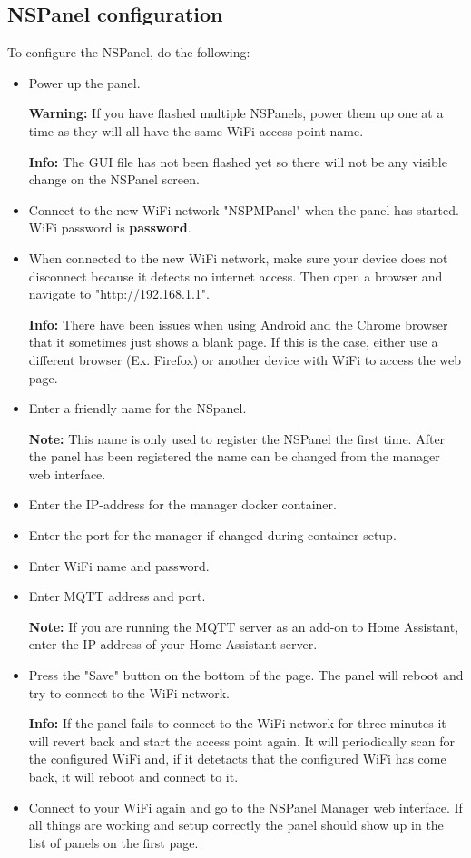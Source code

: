 \documentclass[10pt]{article}
\newcommand{\info}[1]{\begin{infoBox} \textbf{Info:} #1 \end{infoBox}}
\newcommand{\note}[1]{\begin{noteBox} \textbf{Note:} #1 \end{noteBox}}
\newcommand{\warning}[1]{\begin{hintBox} \textbf{Warning:} #1 \end{hintBox}}
\begin{document}
    \subsection{NSPanel configuration}
    \label{sec:nspanel_configuration}
    To configure the NSPanel, do the following:
    \begin{itemize}
      \item Power up the panel.
      \warning{If you have flashed multiple NSPanels, power them up one at a time as they will all have the same WiFi access point name.}
      \info{The GUI file has not been flashed yet so there will not be any visible change on the NSPanel screen.}
      \item Connect to the new WiFi network "NSPMPanel" when the panel has started. WiFi password is \textbf{password}.
      \item When connected to the new WiFi network, make sure your device does not disconnect because it detects no internet access. Then open a browser and navigate to "http://192.168.1.1".
      \info{There have been issues when using Android and the Chrome browser that it sometimes just shows a blank page. If this is the case, either use a different browser (Ex. Firefox) or another device with WiFi to access the web page.}
      \item Enter a friendly name for the NSpanel.
      \note{This name is only used to register the NSPanel the first time. After the panel has been registered the name can be changed from the manager web interface.}
      \item Enter the IP-address for the manager docker container.
      \item Enter the port for the manager if changed during container setup.
      \item Enter WiFi name and password.
      \item Enter MQTT address and port.
      \note{If you are running the MQTT server as an add-on to Home Assistant, enter the IP-address of your Home Assistant server.}
      \item Press the "Save" button on the bottom of the page. The panel will reboot and try to connect to the WiFi network.
      \info{If the panel fails to connect to the WiFi network for three minutes it will revert back and start the access point again. It will periodically scan for the configured WiFi and, if it detetacts that the configured WiFi has come back, it will reboot and connect to it.}
      \item Connect to your WiFi again and go to the NSPanel Manager web interface. If all things are working and setup correctly the panel should show up in the list of panels on the first page.

\end{itemize}
\end{document}
